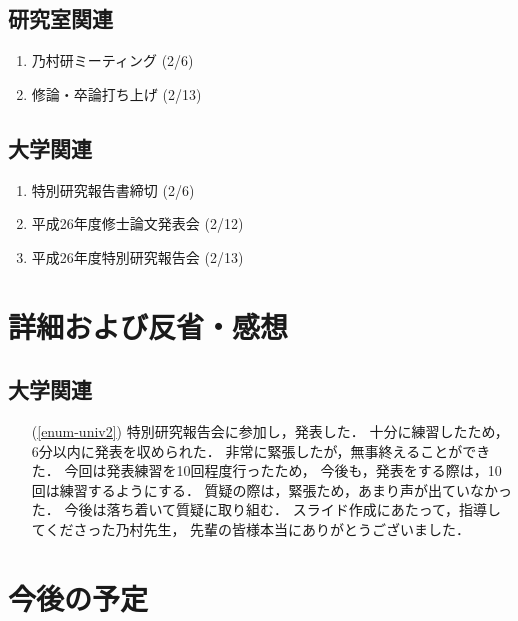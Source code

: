 \documentclass[fleqn, 14pt]{extarticle}
\begin{document}
\subsection{研究室関連}
\label{sec-2-2}
\begin{enumerate}
\item 乃村研ミーティング 
\hfill
\label{enum-lab1}
(2/6)

\item 修論・卒論打ち上げ 
\hfill
\label{enum-lab1}
(2/13)
\end{enumerate}

\subsection{大学関連}
\label{sec2-3}
\begin{enumerate}
    \item 特別研究報告書締切
    \hfill
    \label{enum-univ1}
    (2/6)
    \item 平成26年度修士論文発表会 
    \hfill
    \label{enum-univ0}
    (2/12)

    \item 平成26年度特別研究報告会
    \hfill
    \label{enum-univ2}
    (2/13)
\end{enumerate}

\section{詳細および反省・感想}
\label{sec-3}
\setcounter{subsection}{2}
\subsection{大学関連}
\label{sec-3-1}

\begin{itemize}
\item[(\ref{enum-univ2})]
    特別研究報告会に参加し，発表した．
    十分に練習したため，6分以内に発表を収められた．
    非常に緊張したが，無事終えることができた．
    今回は発表練習を10回程度行ったため，
    今後も，発表をする際は，10回は練習するようにする．
    質疑の際は，緊張ため，あまり声が出ていなかった．
    今後は落ち着いて質疑に取り組む．
    スライド作成にあたって，指導してくださった乃村先生，
    先輩の皆様本当にありがとうございました．
\end{itemize}

\section{今後の予定}
\label{sec-4}
\end{document}
